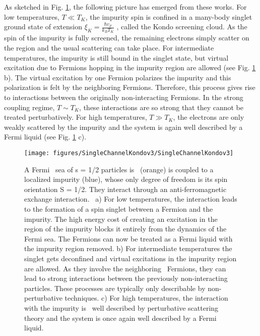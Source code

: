 \documentclass[10pt]{article}
\begin{document}
As sketched in Fig. \ref{943637}, the following picture has emerged from these works. For low temperatures, $T\ll T_K$, the impurity spin is confined in a many-body singlet ground state of extension $\xi_K = \frac{\hbar v_F}{k_B T_K}$ , called the Kondo screening cloud. As the spin of the impurity is fully screened, the remaining electrons simply scatter on the region and the usual scattering can take place. For intermediate temperatures, the impurity is still bound in the singlet state, but virtual excitation due to Fermions hopping in the impurity region are allowed (see Fig. \ref{943637} b). The virtual excitation by one Fermion polarizes the impurity and this polarization is felt by the neighboring Fermions. Therefore, this process gives rise to interactions between the originally non-interacting Fermions. In the strong coupling regime, $T\sim T_K$, these interactions are so strong that they cannot be treated perturbatively. For high temperatures, $T\gg T_K$, the electrons are only weakly scattered by the impurity and the system is again well described by a Fermi liquid (see Fig. \ref{943637} c).
\begin{figure}[h!]
\begin{center}
\texttt{[image: figures/SingleChannelKondov3/SingleChannelKondov3]}
\caption{{A Fermi~ sea of s = 1/2 particles is~ (orange) is coupled to a localized
impurity (blue), whose only degree of freedom is its spin orientation S
= 1/2. They interact through an anti-ferromagnetic exchange
interaction.~ a) For low temperatures, the interaction leads to the
formation of a spin singlet between a Fermion and the impurity. The high
energy cost of creating an excitation in the region of the impurity
blocks it entirely from the dynamics of the Fermi sea. The Fermions can
now be treated as a Fermi liquid with the impurity region removed. b)
For intermediate temperatures the singlet gets deconfined and virtual
excitations in the impurity region are allowed. As they involve the
neighboring~ Fermions, they can lead to strong interactions between the
previously non-interacting particles. These processes are typically only
describable by non-perturbative techniques. c) For high temperatures,
the interaction with the impurity is~ well described by perturbative
scattering theory and the system is once again well described by a Fermi
liquid.~
{\label{943637}}%
}}
\end{center}
\end{figure}
\end{document}
